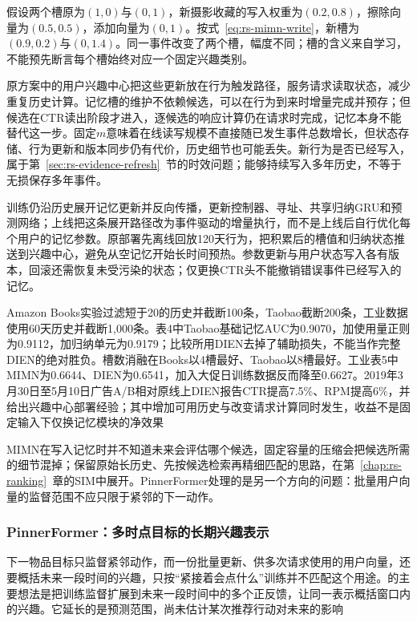 假设两个槽原为$(1,0)$与$(0,1)$，新摄影收藏的写入权重为$(0.2,0.8)$，擦除向量为$(0.5,0.5)$，添加向量为$(0,1)$。按式~\eqref{eq:rs-mimn-write}，新槽为$(0.9,0.2)$与$(0,1.4)$。同一事件改变了两个槽，幅度不同；槽的含义来自学习，不能预先断言每个槽始终对应一个固定兴趣类别。

原方案中的用户兴趣中心把这些更新放在行为触发路径，服务请求读取状态，减少重复历史计算。记忆槽的维护不依赖候选，可以在行为到来时增量完成并预存；但候选在CTR读出阶段才进入，逐候选的响应计算仍在请求时完成，记忆本身不能替代这一步。固定$m$意味着在线读写规模不直接随已发生事件总数增长，但状态存储、行为更新和版本同步仍有代价，历史细节也可能丢失。新行为是否已经写入，属于第~\ref{sec:rs-evidence-refresh}~节的时效问题；能够持续写入多年历史，不等于无损保存多年事件。

训练仍沿历史展开记忆更新并反向传播，更新控制器、寻址、共享归纳GRU和预测网络；上线把这条展开路径改为事件驱动的增量执行，而不是上线后自行优化每个用户的记忆参数。原部署先离线回放120天行为，把积累后的槽值和归纳状态推送到兴趣中心，避免从空记忆开始长时间预热。参数更新与用户状态写入各有版本，回滚还需恢复未受污染的状态；仅更换CTR头不能撤销错误事件已经写入的记忆。

Amazon Books实验过滤短于20的历史并截断100条，Taobao截断200条，工业数据使用60天历史并截断1,000条。表4中Taobao基础记忆AUC为0.9070，加使用量正则为0.9112，加归纳单元为0.9179；比较所用DIEN去掉了辅助损失，不能当作完整DIEN的绝对胜负。槽数消融在Books以4槽最好、Taobao以8槽最好。工业表5中MIMN为0.6644、DIEN为0.6541，加入大促日训练数据反而降至0.6627。2019年3月30日至5月10日广告A/B相对原线上DIEN报告CTR提高7.5\%、RPM提高6\%，并给出兴趣中心部署经验；其中增加可用历史与改变请求计算同时发生，收益不是固定输入下仅换记忆模块的净效果

MIMN在写入记忆时并不知道未来会评估哪个候选，固定容量的压缩会把候选所需的细节混掉；保留原始长历史、先按候选检索再精细匹配的思路，在第~\ref{chap:rs-ranking}~章的SIM中展开。PinnerFormer处理的是另一个方向的问题：批量用户向量的监督范围不应只限于紧邻的下一动作。
\subsubsection{PinnerFormer：多时点目标的长期兴趣表示}
\label{sec:rs-pinnerformer}

下一物品目标只监督紧邻动作，而一份批量更新、供多次请求使用的用户向量，还要概括未来一段时间的兴趣，只按“紧接着会点什么”训练并不匹配这个用途。的主要想法是把训练监督扩展到未来一段时间中的多个正反馈，让同一表示概括窗口内的兴趣。它延长的是预测范围，尚未估计某次推荐行动对未来的影响

